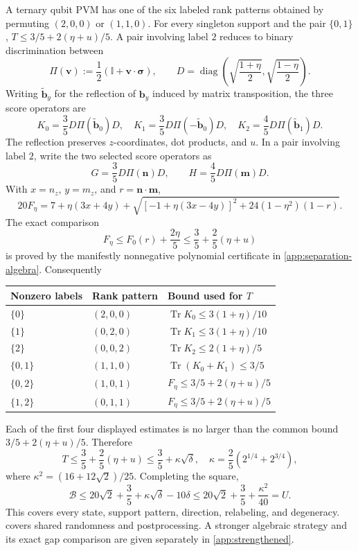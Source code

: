 \documentclass[11pt]{article}
\theoremstyle{definition}
\newcommand{\Tr}{\operatorname{Tr}}
\newcommand{\id}{\mathbb I}
\newcommand{\Bell}{\mathcal B}
\begin{document}
A ternary qubit PVM has one of the six labeled rank patterns obtained by
permuting \((2,0,0)\) or \((1,1,0)\). For every singleton support and the
pair \(\{0,1\}\), \(T\le3/5+2(\eta+u)/5\). A pair involving label \(2\)
reduces to binary discrimination between
\[
\Pi(\bm v):=\frac12(\id+\bm v\cdot\bm\sigma),\qquad
D=\operatorname{diag}\!\left(
\sqrt{\frac{1+\eta}{2}},\sqrt{\frac{1-\eta}{2}}\right).
\]
Writing \(\widetilde{\bm b}_y\) for the reflection of \(\bm b_y\) induced by
matrix transposition, the three score operators are
\[
K_0=\frac35D\Pi(\widetilde{\bm b}_0)D,\quad
K_1=\frac35D\Pi(-\widetilde{\bm b}_0)D,\quad
K_2=\frac45D\Pi(\widetilde{\bm b}_1)D.
\]
The reflection preserves \(z\)-coordinates, dot products, and \(u\). In a
pair involving label \(2\), write the two selected score operators as
\[
G=\frac35D \Pi(\bm n)D,\qquad
H=\frac45D \Pi(\bm m)D.
\]
With \(x=n_z\), \(y=m_z\), and \(r=\bm n\cdot\bm m\),
\[
20F_\eta
=7+\eta(3x+4y)
+\sqrt{[-1+\eta(3x-4y)]^2+24(1-\eta^2)(1-r)}.
\]
The exact comparison
\[
F_\eta\le F_0(r)+\frac{2\eta}{5}
\le\frac35+\frac25(\eta+u)
\]
is proved by the manifestly nonnegative polynomial certificate in
\cref{app:separation-algebra}. Consequently
\begin{center}
\small
\begin{tabular}{@{}lll@{}}
\toprule
Nonzero labels & Rank pattern & Bound used for \(T\)\\
\midrule
\(\{0\}\) & \((2,0,0)\) & \(\Tr K_0\le3(1+\eta)/10\)\\
\(\{1\}\) & \((0,2,0)\) & \(\Tr K_1\le3(1+\eta)/10\)\\
\(\{2\}\) & \((0,0,2)\) & \(\Tr K_2\le2(1+\eta)/5\)\\
\(\{0,1\}\) & \((1,1,0)\) & \(\Tr(K_0+K_1)\le3/5\)\\
\(\{0,2\}\) & \((1,0,1)\) & \(F_\eta\le3/5+2(\eta+u)/5\)\\
\(\{1,2\}\) & \((0,1,1)\) & \(F_\eta\le3/5+2(\eta+u)/5\)\\
\bottomrule
\end{tabular}
\end{center}
Each of the first four displayed estimates is no larger than the common
bound \(3/5+2(\eta+u)/5\). Therefore
\[
T\le\frac35+\frac25(\eta+u)
\le\frac35+\kappa\sqrt\delta,
\quad
\kappa=\frac25(2^{1/4}+2^{3/4}),
\]
where \(\kappa^2=(16+12\sqrt2)/25\). Completing the square,
\[
\Bell\le20\sqrt2+\frac35+\kappa\sqrt\delta-10\delta
\le20\sqrt2+\frac35+\frac{\kappa^2}{40}=U.
\]
This covers every state, support pattern, direction, relabeling, and
degeneracy.  covers shared randomness and
postprocessing. A stronger algebraic strategy and its exact gap comparison
are given separately in \cref{app:strengthened}.
\end{document}

